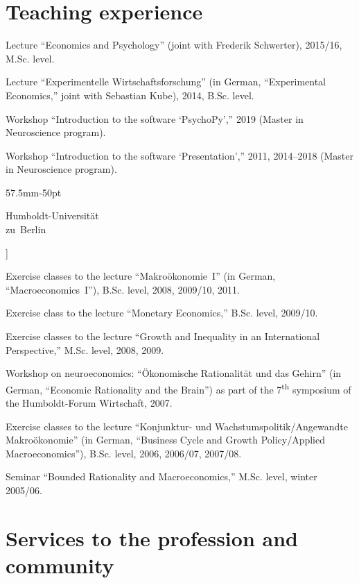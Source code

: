 \documentclass[11pt, a4paper, titleabove]{simplecv}
\renewcommand{\topicmargin}{57.5mm}
\newcommand{\multiline}[1]{%
	\parbox[t][10pt][t]{\topicmargin-50pt}{\RaggedLeft%
		#1%
		\normalsize\par%
	}%
}
\begin{document}
\section{Teaching experience}

\begin{topic}

	\item[University of Bonn]
	Lecture ``Economics and Psychology'' (joint with Frederik Schwer\-ter), 2015/16, M.Sc. level.

	Lecture {``Experimentelle Wirtschaftsforschung''} (in German, ``Ex\-peri\-mental Economics,'' joint with Sebastian Kube), 2014, B.Sc. level.

	Workshop ``Introduction to the software `PsychoPy','' 2019 (Master in Neuroscience program).

	Workshop ``Introduction to the software `Presentation','' 2011, 2014--2018 (Master in Neuroscience program).

	\item[\multiline{Humboldt-Universität \\ zu~Berlin}]

	Exercise classes to the lecture {``Makroökonomie~I''} (in German, ``Macro\-economics~I''), B.Sc. level, 2008, 2009/10, 2011.

	Exercise class to the lecture ``Monetary Economics,'' B.Sc. level, 2009/10.

	Exercise classes to the lecture ``Growth and Inequality in an Inter\-national Perspective,'' M.Sc. level, 2008, 2009.

	Workshop on neuroeconomics: {``Ökonomische Rationalität und das Gehirn''} (in German, ``Economic Rationality and the Brain'') as part of the 7\textsuperscript{th} symposium of the {Humboldt-Forum Wirtschaft,} 2007.

	Exercise classes to the lecture {``Konjunktur- und Wachs\-tums\-politik/\hspace{0pt}Angewandte Makroökonomie''} (in German, ``Business Cycle and Growth Policy/\hspace{0pt}Applied Macroeconomics''), B.Sc. level, 2006, 2006/07, 2007/08.

	Seminar ``Bounded Rationality and Macroeconomics,'' M.Sc. level, winter 2005/06.

\end{topic}


\section{Services to the profession and community}
\end{document}
